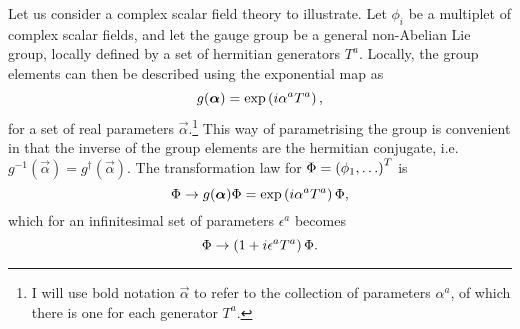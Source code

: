 \documentclass[../main.tex]{subfiles}
\begin{document}
Let us consider a complex scalar field theory to illustrate.
Let \(\phi_i\) be a multiplet of complex scalar fields, and let the gauge group be a general non-Abelian Lie group, locally defined by a set of hermitian generators \(T^a\).
Locally, the group elements can then be described using the exponential map as
\begin{equation}
  \label{qft:eq:exponential_map}
  g(\boldsymbol{\alpha}) = \operatorname{exp}\left(i \alpha^a T^a\right),
\end{equation}
for a set of real parameters \(\vec{\alpha}\).\footnote{I will use bold
  notation \(\vec\alpha\) to refer to the collection of parameters
  \(\alpha^a\), of which there is one for each generator \(T^a\).}
This way of parametrising the group is convenient in that the inverse of the group elements are the hermitian conjugate, i.e.\ \(g^{-1}(\vec\alpha) = g^\dagger(\vec{\alpha})\).
The transformation law for \(\Phi = \left(\phi_1, \ldots\right)^T\) is
\begin{equation}
  \label{qft:eq:gauge_transformation}
  \Phi \to g(\boldsymbol{\alpha}) \Phi = \operatorname{exp}\left(i \alpha^a T^a\right) \Phi,
\end{equation}
which for an infinitesimal set of parameters \(\epsilon^a\) becomes
\begin{equation}
  \Phi \to \left(1 + i \epsilon^a T^a\right) \Phi.
\end{equation}
\medskip
\end{document}
